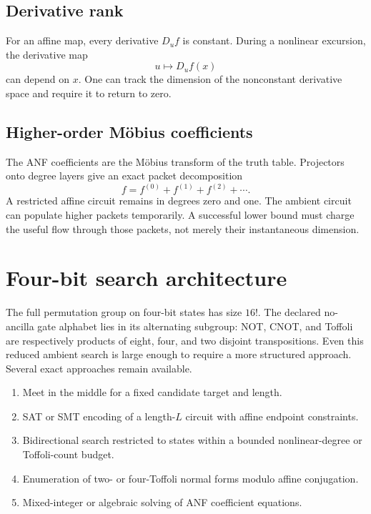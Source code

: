 \subsection{Derivative rank}
For an affine map, every derivative $D_u f$ is constant.  During a nonlinear excursion, the derivative map
\[
u\mapsto D_u f(x)
\]
can depend on $x$.  One can track the dimension of the nonconstant derivative space and require it to return to zero.

\subsection{Higher-order Möbius coefficients}
The ANF coefficients are the Möbius transform of the truth table.  Projectors onto degree layers give an exact packet decomposition
\[
f=f^{(0)}+f^{(1)}+f^{(2)}+\cdots.
\]
A restricted affine circuit remains in degrees zero and one.  The ambient circuit can populate higher packets temporarily.  A successful lower bound must charge the useful flow through those packets, not merely their instantaneous dimension.

\section{Four-bit search architecture}
The full permutation group on four-bit states has size $16!$.  The declared no-ancilla gate alphabet lies in its alternating subgroup: NOT, CNOT, and Toffoli are respectively products of eight, four, and two disjoint transpositions.  Even this reduced ambient search is large enough to require a more structured approach.  Several exact approaches remain available.
\begin{enumerate}
\item Meet in the middle for a fixed candidate target and length.
\item SAT or SMT encoding of a length-$L$ circuit with affine endpoint constraints.
\item Bidirectional search restricted to states within a bounded nonlinear-degree or Toffoli-count budget.
\item Enumeration of two- or four-Toffoli normal forms modulo affine conjugation.
\item Mixed-integer or algebraic solving of ANF coefficient equations.
\end{enumerate}

